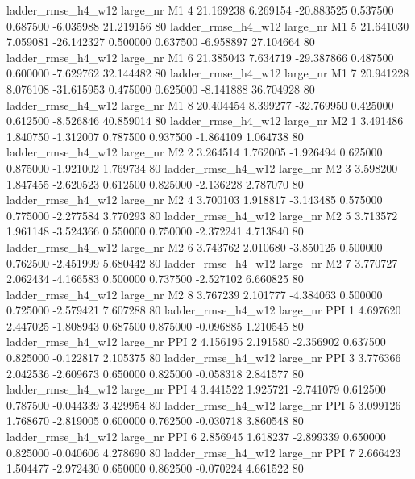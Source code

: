 ladder_rmse_h4_w12   large_nr       M1                 4 21.169238  6.269154 -20.883525 0.537500 0.687500 -6.035988   21.219156 80
 ladder_rmse_h4_w12   large_nr       M1                 5 21.641030  7.059081 -26.142327 0.500000 0.637500 -6.958897   27.104664 80
 ladder_rmse_h4_w12   large_nr       M1                 6 21.385043  7.634719 -29.387866 0.487500 0.600000 -7.629762   32.144482 80
 ladder_rmse_h4_w12   large_nr       M1                 7 20.941228  8.076108 -31.615953 0.475000 0.625000 -8.141888   36.704928 80
 ladder_rmse_h4_w12   large_nr       M1                 8 20.404454  8.399277 -32.769950 0.425000 0.612500 -8.526846   40.859014 80
 ladder_rmse_h4_w12   large_nr       M2                 1  3.491486  1.840750  -1.312007 0.787500 0.937500 -1.864109    1.064738 80
 ladder_rmse_h4_w12   large_nr       M2                 2  3.264514  1.762005  -1.926494 0.625000 0.875000 -1.921002    1.769734 80
 ladder_rmse_h4_w12   large_nr       M2                 3  3.598200  1.847455  -2.620523 0.612500 0.825000 -2.136228    2.787070 80
 ladder_rmse_h4_w12   large_nr       M2                 4  3.700103  1.918817  -3.143485 0.575000 0.775000 -2.277584    3.770293 80
 ladder_rmse_h4_w12   large_nr       M2                 5  3.713572  1.961148  -3.524366 0.550000 0.750000 -2.372241    4.713840 80
 ladder_rmse_h4_w12   large_nr       M2                 6  3.743762  2.010680  -3.850125 0.500000 0.762500 -2.451999    5.680442 80
 ladder_rmse_h4_w12   large_nr       M2                 7  3.770727  2.062434  -4.166583 0.500000 0.737500 -2.527102    6.660825 80
 ladder_rmse_h4_w12   large_nr       M2                 8  3.767239  2.101777  -4.384063 0.500000 0.725000 -2.579421    7.607288 80
 ladder_rmse_h4_w12   large_nr      PPI                 1  4.697620  2.447025  -1.808943 0.687500 0.875000 -0.096885    1.210545 80
 ladder_rmse_h4_w12   large_nr      PPI                 2  4.156195  2.191580  -2.356902 0.637500 0.825000 -0.122817    2.105375 80
 ladder_rmse_h4_w12   large_nr      PPI                 3  3.776366  2.042536  -2.609673 0.650000 0.825000 -0.058318    2.841577 80
 ladder_rmse_h4_w12   large_nr      PPI                 4  3.441522  1.925721  -2.741079 0.612500 0.787500 -0.044339    3.429954 80
 ladder_rmse_h4_w12   large_nr      PPI                 5  3.099126  1.768670  -2.819005 0.600000 0.762500 -0.030718    3.860548 80
 ladder_rmse_h4_w12   large_nr      PPI                 6  2.856945  1.618237  -2.899339 0.650000 0.825000 -0.040606    4.278690 80
 ladder_rmse_h4_w12   large_nr      PPI                 7  2.666423  1.504477  -2.972430 0.650000 0.862500 -0.070224    4.661522 80

